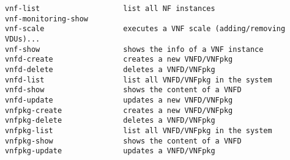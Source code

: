 \begin{lstlisting}
vnf-list                   list all NF instances
vnf-monitoring-show
vnf-scale                  executes a VNF scale (adding/removing VDUs)...
vnf-show                   shows the info of a VNF instance
vnfd-create                creates a new VNFD/VNFpkg
vnfd-delete                deletes a VNFD/VNFpkg
vnfd-list                  list all VNFD/VNFpkg in the system
vnfd-show                  shows the content of a VNFD
vnfd-update                updates a new VNFD/VNFpkg
vnfpkg-create              creates a new VNFD/VNFpkg
vnfpkg-delete              deletes a VNFD/VNFpkg
vnfpkg-list                list all VNFD/VNFpkg in the system
vnfpkg-show                shows the content of a VNFD
vnfpkg-update              updates a VNFD/VNFpkg
\end{lstlisting}
\cleardoublepage